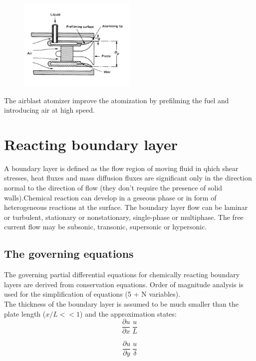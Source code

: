 \documentclass[12pt]{article}
\begin{document}
\begin{figure}[h!]
\centering
\includegraphics[width=0.5\textwidth]{figures/airblast.png}
\end{figure}

The airblast atomizer improve the atomization by prefilming the fuel and introducing air at high speed.

\newpage

\section{Reacting boundary layer}

A boundary layer is defined as the flow region of moving fluid in qhich shear stresses, heat fluxes and mass diffusion fluxes are significant only in the direction normal to the direction of flow (they don't require the presence of solid walls).Chemical reaction can develop in a geseous phase or in form of heterogeneous reactions at the surface.
The boundary layer flow can be laminar or turbulent, stationary or nonstationary, single-phase or multiphase. The free current flow may be subsonic, transonic, supersonic or hypersonic.

\subsection{The governing equations}

The governing partial differential equations for chemically reacting boundary layers are derived from conservation equations. Order of magnitude analysis is used for the simplification of equations (5 + N variables).\\
The thickness of the boundary layer is assumed to be much smaller than the plate length ($x/L<<1$) and the approximation states:
\begin{equation}
    \frac{\partial u}{\partial x} ~ \frac{u}{L}
\end{equation}

\begin{equation}
    \frac{\partial u}{\partial y} ~ \frac{u}{\delta}
\end{equation}
\end{document}

